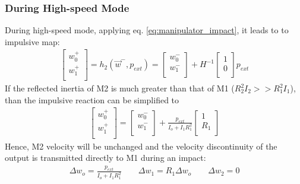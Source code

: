 \subsubsection{During High-speed Mode}

During high-speed mode, applying eq. \eqref{eq:manipulator_impact}, it leads to to impulsive map:
%
\begin{align}
\left[
\begin{array}{c}
w_0^+ \\
w_1^+ \\
\end{array}
\right] = h_2( \vec{w}^- , p_{ext} ) = 
\left[
\begin{array}{c}
w_0^- \\
w_1^- \\
\end{array}
\right] +
H^{-1} \left[
\begin{array}{c}
1 \\
0 \\
\end{array}
\right] p_{ext}
\label{eq:h2}
\end{align}
%
If the reflected inertia of M2 is much greater than that of M1 ($R_2^2 I_2 >> R_1^2 I_1 $), than the impulsive reaction can be simplified to 
%
\begin{align}
\left[
\begin{array}{c}
w_0^+ \\
w_1^+ \\
\end{array}
\right] = 
\left[
\begin{array}{c}
w_0^- \\
w_1^- \\
\end{array}
\right] +
\frac{ p_{ext} }{ I_o + I_1 R_1^2} 
\left[
\begin{array}{c}
1 \\
R_1 \\
\end{array}
\right] 
\end{align}
%
Hence, M2 velocity will be unchanged and the velocity discontinuity of the output is transmitted directly to M1 during an impact:
%
\begin{align}
\Delta w_o  = \frac{ p_{ext} }{ I_o + I_1 R_1^2}  \quad\quad  %
\Delta w_1  =  R_1 \Delta w_o \quad\quad                      %
\Delta w_2  =  0                                         %
\label{eq:dsdm_impact_gen_delta_w1}
\end{align}


